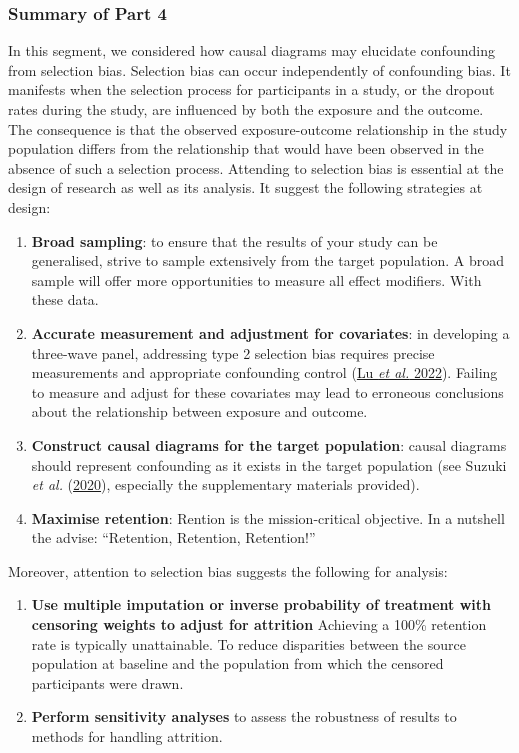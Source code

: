 \documentclass[
  singlecolumn]{article}
\begin{document}
\hypertarget{summary-of-part-4}{%
\subsubsection{Summary of Part 4}\label{summary-of-part-4}}

In this segment, we considered how causal diagrams may elucidate
confounding from selection bias. Selection bias can occur independently
of confounding bias. It manifests when the selection process for
participants in a study, or the dropout rates during the study, are
influenced by both the exposure and the outcome. The consequence is that
the observed exposure-outcome relationship in the study population
differs from the relationship that would have been observed in the
absence of such a selection process. Attending to selection bias is
essential at the design of research as well as its analysis. It suggest
the following strategies at design:

\begin{enumerate}
\def\labelenumi{\arabic{enumi}.}
\item
  \textbf{Broad sampling}: to ensure that the results of your study can
  be generalised, strive to sample extensively from the target
  population. A broad sample will offer more opportunities to measure
  all effect modifiers. With these data.
\item
  \textbf{Accurate measurement and adjustment for covariates}: in
  developing a three-wave panel, addressing type 2 selection bias
  requires precise measurements and appropriate confounding control
  (\protect\hyperlink{ref-lu2022}{Lu \emph{et al.} 2022}). Failing to
  measure and adjust for these covariates may lead to erroneous
  conclusions about the relationship between exposure and outcome.
\item
  \textbf{Construct causal diagrams for the target population}: causal
  diagrams should represent confounding as it exists in the target
  population (see Suzuki \emph{et al.}
  (\protect\hyperlink{ref-suzuki2020}{2020}), especially the
  supplementary materials provided).
\item
  \textbf{Maximise retention}: Rention is the mission-critical
  objective. In a nutshell the advise: ``Retention, Retention,
  Retention!''
\end{enumerate}

Moreover, attention to selection bias suggests the following for
analysis:

\begin{enumerate}
\def\labelenumi{\arabic{enumi}.}
\setcounter{enumi}{4}
\item
  \textbf{Use multiple imputation or inverse probability of treatment
  with censoring weights to adjust for attrition} Achieving a 100\%
  retention rate is typically unattainable. To reduce disparities
  between the source population at baseline and the population from
  which the censored participants were drawn.
\item
  \textbf{Perform sensitivity analyses} to assess the robustness of
  results to methods for handling attrition.
\end{enumerate}
\end{document}
